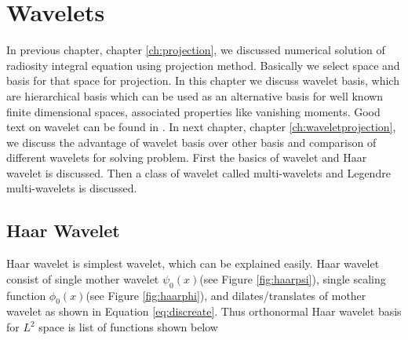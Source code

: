 \chapter{\label{ch:wavelets}Wavelets}
In previous chapter, chapter \ref{ch:projection}, we discussed numerical solution of radiosity integral equation using projection method. Basically we select space and basis for that space for projection. In this chapter we discuss wavelet basis, which are hierarchical basis which can be used as an alternative basis for well known finite dimensional spaces, associated properties like vanishing moments. Good text on wavelet can be found in \cite{book:goswami} \cite{book:Stollnitz}. In next chapter, chapter \ref{ch:waveletprojection}, we discuss the advantage of wavelet basis over other basis and comparison of different wavelets for solving problem. First the basics of wavelet and Haar wavelet is discussed. Then a class of wavelet called multi-wavelets and Legendre multi-wavelets is discussed.\\


\section{Haar Wavelet}
Haar wavelet is simplest wavelet, which can be explained easily. Haar wavelet consist of single mother wavelet $\psi_0(x)$(see Figure \ref{fig:haarpsi}), single scaling function $\phi_0(x)$(see Figure \ref{fig:haarphi}), and dilates/translates of mother wavelet as shown in Equation \ref{eq:discreate}.  Thus orthonormal Haar wavelet basis for $L^2$ space is list of functions shown below

